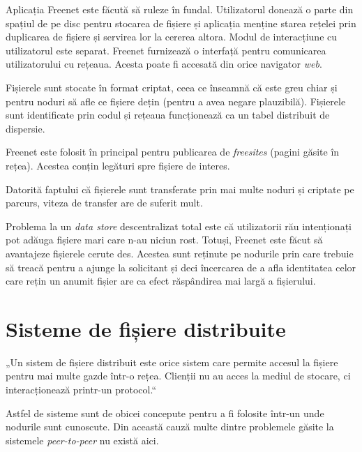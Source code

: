 \documentclass[a4wide,12pt]{report}
\newcommand{\eng}[1]{\emph{#1}} %
\newcommand{\acr}[1]{{\textsmaller[1]{\textsc{#1}}}} %
\begin{document}
Aplicația Freenet este făcută să ruleze în fundal. Utilizatorul donează o parte din spațiul de pe disc pentru stocarea
de fișiere și aplicația menține starea rețelei prin duplicarea de fișiere și servirea lor la cererea altora. Modul de
interacțiune cu utilizatorul este separat. Freenet furnizează o interfață \acr{HTTP} pentru comunicarea utilizatorului
cu rețeaua. Acesta poate fi accesată din orice navigator \eng{web}.

Fișierele sunt stocate în format criptat, ceea ce înseamnă că este greu chiar și pentru noduri să afle ce fișiere dețin
(pentru a avea negare plauzibilă). Fișierele sunt identificate prin codul \acr{SHA-256} și rețeaua funcționează ca un
tabel distribuit de dispersie.

Freenet este folosit în principal pentru publicarea de \eng{freesites} (pagini \acr{HTML} găsite în rețea). Acestea
conțin legături spre fișiere de interes.

Datorită faptului că fișierele sunt transferate prin mai multe noduri și criptate pe parcurs, viteza de transfer are de
suferit mult.

Problema la un \eng{data store} descentralizat total este că utilizatorii rău intenționați pot adăuga fișiere mari care
n-au niciun rost. Totuși, Freenet este făcut să avantajeze fișierele cerute des. Acestea sunt reținute pe nodurile prin
care trebuie să treacă pentru a ajunge la solicitant și deci încercarea de a afla identitatea celor care rețin un anumit
fișier are ca efect răspândirea mai largă a fișierului.

\section{Sisteme de fișiere distribuite} %

„Un sistem de fișiere distribuit este orice sistem care permite accesul la fișiere pentru mai multe gazde într-o
rețea. Clienții nu au acces la mediul de stocare, ci interacționează printr-un protocol.“\cite{wikidfs}

Astfel de sisteme sunt de obicei concepute pentru a fi folosite într-un \acr{LAN} unde nodurile sunt cunoscute. Din
această cauză multe dintre problemele găsite la sistemele \eng{peer-to-peer} nu există aici.

\subsection{\acr{NFS}} %
\end{document}
